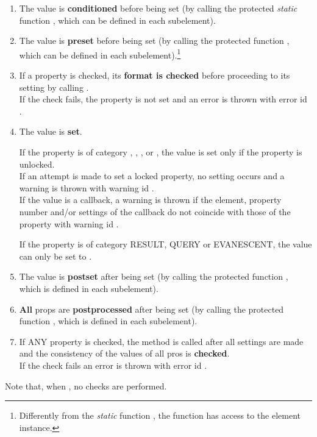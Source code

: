 \documentclass{tufte-handout}
\begin{document}
\begin{enumerate}
	\item The value is {\bf conditioned} before being set (by calling the protected \emph{static} function , which can be defined in each subelement).
	
	\item The value is {\bf preset} before being set (by calling the protected function , which can be defined in each subelement).\footnote{Differently from the \emph{static} function , the function  has access to the element instance.}
	
	\item If a property is checked, its {\bf format is checked} before proceeding to its setting by calling .\\
	If the check fails, the property is not set and an error is thrown with error id .

	\item The value is {\bf set}.

		If the property is of category , , , or , the value is set only if the property is unlocked.\\
		If an attempt is made to set a locked property, no setting occurs and a warning is thrown with warning id .\\
		If the value is a callback, a warning is thrown if the element, property number and/or settings of the callback do not coincide with those of the property with warning id .
 
		If the property is of category RESULT, QUERY or EVANESCENT, the value can only be set to .

	\item The value is {\bf postset} after being set (by calling the protected function , which is defined in each subelement).

	\item {\bf All} props are {\bf postprocessed} after being set (by calling the protected function , which is defined in each subelement).

	\item If ANY property is checked, the method  is called after all settings are made and the consistency of the values of all pros is {\bf checked}.\\
	If the check fails an error is thrown with error id .
\end{enumerate} 
Note that, when , no checks are performed.
 
\end{document}
